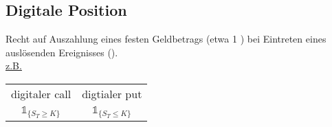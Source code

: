 \subsection{Digitale Position}
\label{sub: digitale_position}
Recht auf Auszahlung eines festen Geldbetrags (etwa 1 \texteuro) bei Eintreten eines auslösenden Ereignisses ().\\
\uline{z.B.}\\
\begin{tabular}{c c}
	digitaler call & digtialer put\\
	$\mathbb{1}_{\{S_T\ge K\}}$ & $\mathbb{1}_{\{S_T\le K \}}$ \\
\end{tabular}


